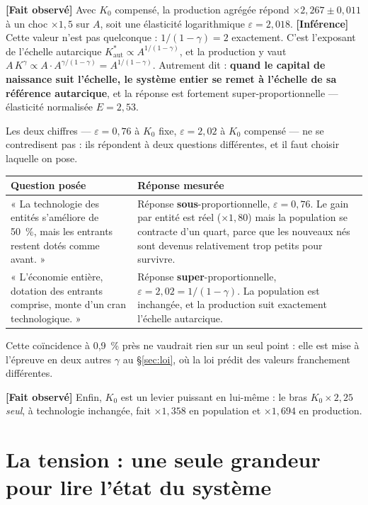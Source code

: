 \documentclass[11pt,a4paper]{article}
\newcommand{\Kaut}{K^{*}_{\mathrm{aut}}}
\newcommand{\fait}{\textbf{[Fait observé]}}
\newcommand{\inference}{\textbf{[Inférence]}}
\begin{document}
\fait{} Avec $K_0$ compensé, la production agrégée répond
$\times2{,}267 \pm 0{,}011$ à un choc $\times1{,}5$ sur $A$, soit une
élasticité logarithmique $\varepsilon = 2{,}018$. \inference{} Cette valeur
n'est pas quelconque : $1/(1-\gamma) = 2$ exactement. C'est l'exposant de
l'échelle autarcique $\Kaut \propto A^{1/(1-\gamma)}$, et la production y
vaut $A\,K^{\gamma} \propto A \cdot A^{\gamma/(1-\gamma)} = A^{1/(1-\gamma)}$.
Autrement dit : \textbf{quand le capital de naissance suit l'échelle, le
système entier se remet à l'échelle de sa référence autarcique}, et la
réponse est fortement super-proportionnelle --- élasticité normalisée
$E = 2{,}53$.

Les deux chiffres --- $\varepsilon = 0{,}76$ à $K_0$ fixe,
$\varepsilon = 2{,}02$ à $K_0$ compensé --- ne se contredisent pas : ils
répondent à deux questions différentes, et il faut choisir laquelle on pose.

\begin{center}
\begin{tabularx}{\textwidth}{@{}lX@{}}
\toprule
\textbf{Question posée} & \textbf{Réponse mesurée} \\
\midrule
« La technologie des entités s'améliore de 50~\%, mais les entrants restent
dotés comme avant. » & Réponse \textbf{sous}-proportionnelle,
$\varepsilon = 0{,}76$. Le gain par entité est réel ($\times1{,}80$) mais la
population se contracte d'un quart, parce que les nouveaux nés sont devenus
relativement trop petits pour survivre. \\
\addlinespace
« L'économie entière, dotation des entrants comprise, monte d'un cran
technologique. » & Réponse \textbf{super}-proportionnelle,
$\varepsilon = 2{,}02 = 1/(1-\gamma)$. La population est inchangée, et la
production suit exactement l'échelle autarcique. \\
\bottomrule
\end{tabularx}
\end{center}

Cette coïncidence à 0,9~\% près ne vaudrait rien sur un seul point : elle est
mise à l'épreuve en deux autres $\gamma$ au §\ref{sec:loi}, où la loi prédit
des valeurs franchement différentes.

\fait{} Enfin, $K_0$ est un levier puissant en lui-même : le bras
$K_0 \times 2{,}25$ \emph{seul}, à technologie inchangée, fait
$\times1{,}358$ en population et $\times1{,}694$ en production.

\section{La tension : une seule grandeur pour lire l'état du système}
\label{sec:tension}
\end{document}
